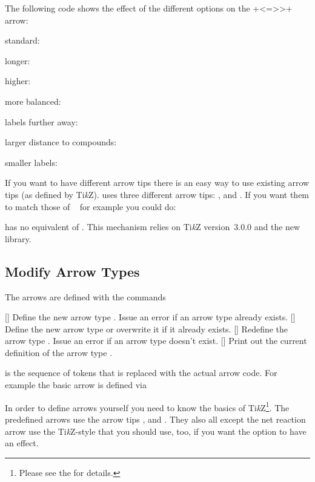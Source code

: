 \documentclass[load-preamble+]{cnltx-doc}
\newcommand*\TikZ{Ti\textit{k}Z}
\begin{document}
The following code shows the effect of the different options on the \verbcode+<=>>+
arrow:
\begin{example}
  standard:  \par
  longer:  \par
  higher:  \par
  more balanced:  \par
  labels further away:  \par
  larger distance to compounds:  \par
  smaller labels: 
\end{example}

If you want to have different arrow tips there is an easy
way to use existing arrow tips (as defined by \TikZ).  \chemformula{} uses
three different arrow tips: ,  and .  If
you want them to match those of ~\cite{pkg:chemfig} for example
you could do:
\begin{sourcecode}
\end{sourcecode}
 has no equivalent of .  This mechanism relies on
\TikZ{} version~3.0.0 and the new  library.

\subsection{Modify Arrow Types}\label{sec:arrows_modify}
The arrows are defined with the commands
\begin{commands}
  [\marg{\TikZ}]
    Define the new arrow type .  Issue an error if an arrow type
     already exists.
  [\marg{\TikZ}]
    Define the new arrow type  or overwrite it if it already
    exists.
  [\marg{\TikZ}]
    Redefine the arrow type .  Issue an error if an arrow type
     doesn't exist.
  []
    Print out the current definition of the arrow type .
\end{commands}
 is the sequence of tokens that is replaced with the actual arrow
code.  For example the basic arrow is defined via
\begin{sourcecode}
\end{sourcecode}
In order to define arrows yourself you need to know the basics of
\TikZ\footnote{Please see the  for details.}.  The
predefined arrows use the arrow tips ,  and .  They also all except the net reaction arrow \code{==} use the
\TikZ-style  that you should use, too, if you want the option
 to have an effect.
\end{document}
